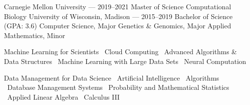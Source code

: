 \documentclass[10pt, letterpaper]{awesome-cv}
\begin{document}
\makecvheader
\begin{minipage}[t]{0.5\textwidth}
\begin{cventries}
    \cvgrad
        {Carnegie Mellon University --- \normalsize{2019--2021}}
        {Master of Science}
        {Computational Biology}
    \cvundergrad
        {University of Wisconsin, Madison --- \normalsize{2015--2019}}
        {Bachelor of Science (GPA: 3.6)}
        {Computer Science, Major}
        {Genetics \& Genomics, Major}
        {Applied Mathematics, Minor}
\end{cventries}
\end{minipage}
\begin{minipage}[t]{0.5\textwidth}
\newcommand{\sep}{\textbar \ }
\cvsectionline \bodyfont \fontsize{18}{1em}
Machine Learning for Scientists 
\sep Cloud Computing 
\sep Advanced Algorithms \& Data Structures 
\sep Machine Learning with Large Data Sets
\sep Neural Computation 

\vspace*{2em}
Data Management for Data Science 
\sep Artificial Intelligence 
\sep Algorithms 
\sep Database Management Systems 
\sep Probability and Mathematical Statistics
\sep Applied Linear Algebra
\sep Calculus III
\end{minipage}
\end{document}

